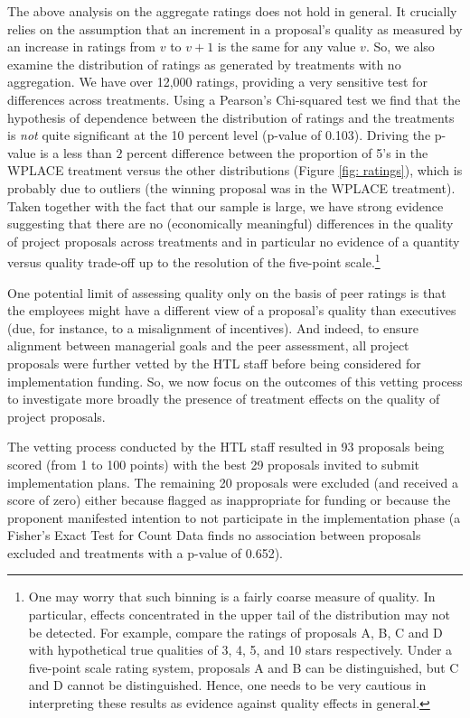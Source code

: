 \documentclass[12pt, titlepage]{article}
\begin{document}
The above analysis on the aggregate ratings does not hold in general. It
crucially relies on the assumption that an increment in a proposal's
quality as measured by an increase in ratings from \(v\) to \(v+1\) is
the same for any value \(v\). So, we also examine the distribution of
ratings as generated by treatments with no aggregation. We have over
12,000 ratings, providing a very sensitive test for differences across
treatments. Using a Pearson's Chi-squared test we find that the
hypothesis of dependence between the distribution of ratings and the
treatments is \emph{not} quite significant at the 10 percent level
(p-value of 0.103). Driving the p-value is a less than \(2\) percent
difference between the proportion of 5's in the WPLACE treatment versus
the other distributions (Figure \ref{fig: ratings}), which is probably
due to outliers (the winning proposal was in the WPLACE treatment).
Taken together with the fact that our sample is large, we have strong
evidence suggesting that there are no (economically meaningful)
differences in the quality of project proposals across treatments and in
particular no evidence of a quantity versus quality trade-off up to the
resolution of the five-point scale.\footnote{One may worry that such
  binning is a fairly coarse measure of quality. In particular, effects
  concentrated in the upper tail of the distribution may not be
  detected. For example, compare the ratings of proposals A, B, C and D
  with hypothetical true qualities of 3, 4, 5, and 10 stars
  respectively. Under a five-point scale rating system, proposals A and
  B can be distinguished, but C and D cannot be distinguished. Hence,
  one needs to be very cautious in interpreting these results as
  evidence against quality effects in general.}

One potential limit of assessing quality only on the basis of peer
ratings is that the employees might have a different view of a
proposal's quality than executives (due, for instance, to a misalignment
of incentives). And indeed, to ensure alignment between managerial goals
and the peer assessment, all project proposals were further vetted by
the HTL staff before being considered for implementation funding. So, we
now focus on the outcomes of this vetting process to investigate more
broadly the presence of treatment effects on the quality of project
proposals.

The vetting process conducted by the HTL staff resulted in 93 proposals
being scored (from 1 to 100 points) with the best 29 proposals invited
to submit implementation plans. The remaining 20 proposals were excluded
(and received a score of zero) either because flagged as inappropriate
for funding or because the proponent manifested intention to not
participate in the implementation phase (a Fisher's Exact Test for Count
Data finds no association between proposals excluded and treatments with
a p-value of 0.652).
\end{document}
